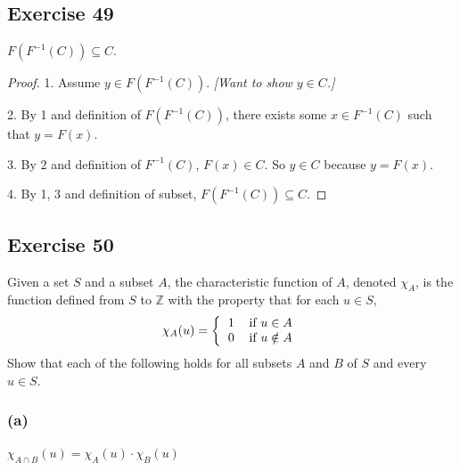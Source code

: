 \documentclass[14pt]{extarticle}
\newcommand{\Z}{\mathbb{Z}}
\begin{document}
\subsection{Exercise 49}
\(F(F^{-1}(C)) \subseteq C\).

\begin{proof}
1. Assume \(y \in F(F^{-1}(C))\). {\it [Want to show \(y \in C\).]}

2. By 1 and definition of \(F(F^{-1}(C))\), there exists some \(x \in F^{-1}(C)\) such that \(y = F(x)\).

3. By 2 and definition of \(F^{-1}(C)\), \(F(x) \in C\). So $y \in C$ because $y = F(x)$.

4. By 1, 3 and definition of subset, \(F(F^{-1}(C)) \subseteq C\).
\end{proof}

\subsection{Exercise 50}
Given a set $S$ and a subset $A$, the characteristic function of $A$, denoted $\chi_A$, is the function defined 
from $S$ to $\Z$ with the property that for each $u \in S$,
\[
\chi_A(u) =
\left\{
\begin{tabular}{lr}
\(1\) & if \(u \in A\) \\
\(0\) & if \(u \notin A\)
\end{tabular}
\right.
\]
Show that each of the following holds for all subsets $A$ and $B$ of $S$ and every $u \in S$.

\subsubsection{(a)}
\(\chi_{A \cap B}(u) = \chi_A(u) \cdot \chi_B(u)\)
\end{document}
